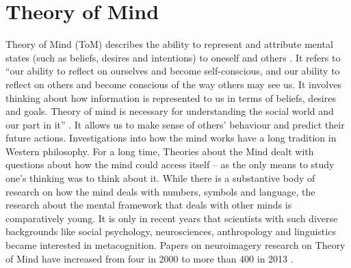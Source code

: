 \documentclass[output=paper]{LSP/langsci}
\begin{document}
\section{Theory of Mind}

Theory of Mind (ToM) describes the ability to represent and attribute mental states (such as beliefs, desires and intentions) to oneself and others \citep{Saxe2004}. It refers to ``our ability to reflect on ourselves and become self-conscious, and our ability to reflect on others and become conscious of the way others may see us. It involves thinking about how information is represented to us in terms of beliefs, desires and goals. Theory of mind is necessary for understanding the social world and our part in it'' \citep[31]{Larkin2010}. It allows us to make sense of others' behaviour and predict their future actions. Investigations into how the mind works have a long tradition in Western philosophy. For a long time, Theories about the Mind dealt with questions about how the mind could access itself -- as the only means to study one's thinking was to think about it. While there is a substantive body of research on how the mind deals with numbers, symbols and language, the research about the mental framework that deals with other minds is comparatively young. It is only in recent years that scientists with such diverse backgrounds like social psychology, neurosciences, anthropology and linguistics became interested in metacognition. Papers on neuroimagery research on Theory of Mind have increased from four in 2000 to more than 400 in 2013 \citep{KosterHale2013}.
\end{document}
